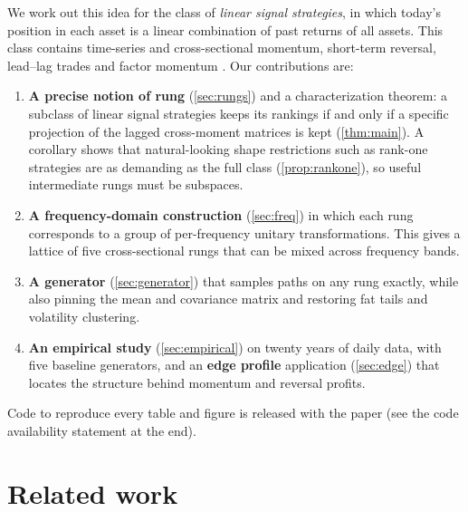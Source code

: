 \documentclass[11pt]{article}
\theoremstyle{definition}
\theoremstyle{remark}
\begin{document}
We work out this idea for the class of \emph{linear signal strategies}, in which today's position in each asset is a
linear combination of past returns of all assets. This class contains time-series and cross-sectional momentum,
short-term reversal, lead--lag trades and factor momentum \citep{jegadeesh1993,lo1990,moskowitz1999,moskowitz2012}. Our contributions are:
\begin{enumerate}[leftmargin=*,itemsep=2pt]
  \item \textbf{A precise notion of rung} (\cref{sec:rungs}) and a characterization theorem: a subclass of linear signal
  strategies keeps its rankings if and only if a specific projection of the lagged cross-moment matrices is kept
  (\cref{thm:main}). A corollary shows that natural-looking shape restrictions such as rank-one strategies are as
  demanding as the full class (\cref{prop:rankone}), so useful intermediate rungs must be subspaces.
  \item \textbf{A frequency-domain construction} (\cref{sec:freq}) in which each rung corresponds to a group of
  per-frequency unitary transformations. This gives a lattice of five cross-sectional rungs that can be mixed across
  frequency bands.
  \item \textbf{A generator} (\cref{sec:generator}) that samples paths on any rung exactly, while also pinning the mean and
  covariance matrix and restoring fat tails and volatility clustering.
  \item \textbf{An empirical study} (\cref{sec:empirical}) on twenty years of daily data, with five baseline generators, and an
  \textbf{edge profile} application (\cref{sec:edge}) that locates the structure behind momentum and reversal profits.
\end{enumerate}
Code to reproduce every table and figure is released with the paper (see the code availability statement at the end).

\section{Related work}
\label{sec:related}
\end{document}
